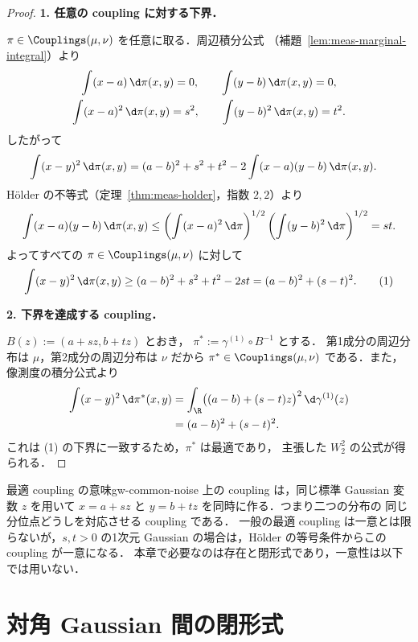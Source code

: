\begin{proof}
  \textbf{1. 任意の coupling に対する下界．}

  $\pi\in\Couplings(\mu,\nu)$ を任意に取る．周辺積分公式
  （補題~\ref{lem:meas-marginal-integral}）より
  \[
    \begin{gathered}
      \int(x-a)\,\d\pi(x,y)=0,
      \qquad
      \int(y-b)\,\d\pi(x,y)=0,\\
      \int(x-a)^2\,\d\pi(x,y)=s^2,
      \qquad
      \int(y-b)^2\,\d\pi(x,y)=t^2.
    \end{gathered}
  \]
  したがって
  \[
    \begin{aligned}
      \int(x-y)^2\,\d\pi(x,y)
      &=(a-b)^2+s^2+t^2
        -2\int(x-a)(y-b)\,\d\pi(x,y).
    \end{aligned}
  \]
  Hölder の不等式（定理~\ref{thm:meas-holder}，指数 $2,2$）より
  \[
    \int(x-a)(y-b)\,\d\pi(x,y)
    \leq
    \left(\int(x-a)^2\,\d\pi\right)^{1/2}
    \left(\int(y-b)^2\,\d\pi\right)^{1/2}
    =st.
  \]
  よってすべての $\pi\in\Couplings(\mu,\nu)$ に対して
  \[
    \int(x-y)^2\,\d\pi(x,y)
    \geq(a-b)^2+s^2+t^2-2st
    =(a-b)^2+(s-t)^2.            \tag{1}
  \]

  \textbf{2. 下界を達成する coupling．}

  $B(z):=(a+sz,b+tz)$ とおき，
  $\pi^*:=\gamma^{(1)}\circ B^{-1}$ とする．
  第1成分の周辺分布は $\mu$，第2成分の周辺分布は $\nu$ だから
  $\pi^*\in\Couplings(\mu,\nu)$ である．また，像測度の積分公式より
  \[
    \begin{aligned}
      \int(x-y)^2\,\d\pi^*(x,y)
      &=\int_{\R}\bigl((a-b)+(s-t)z\bigr)^2
        \,\d\gamma^{(1)}(z)\\
      &=(a-b)^2+(s-t)^2.
    \end{aligned}
  \]
  これは (1) の下界に一致するため，$\pi^*$ は最適であり，
  主張した $W_2^2$ の公式が得られる．
\end{proof}

\begin{remark}{最適 coupling の意味}{gw-common-noise}
  上の coupling は，同じ標準 Gaussian 変数 $z$ を用いて
  $x=a+sz$ と $y=b+tz$ を同時に作る．つまり二つの分布の
  同じ分位点どうしを対応させる coupling である．
  一般の最適 coupling は一意とは限らないが，$s,t>0$ の1次元
  Gaussian の場合は，Hölder の等号条件からこの coupling が一意になる．
  本章で必要なのは存在と閉形式であり，一意性は以下では用いない．
\end{remark}

\section{対角 Gaussian 間の閉形式}
\label{sec:gw-diagonal-formula}


